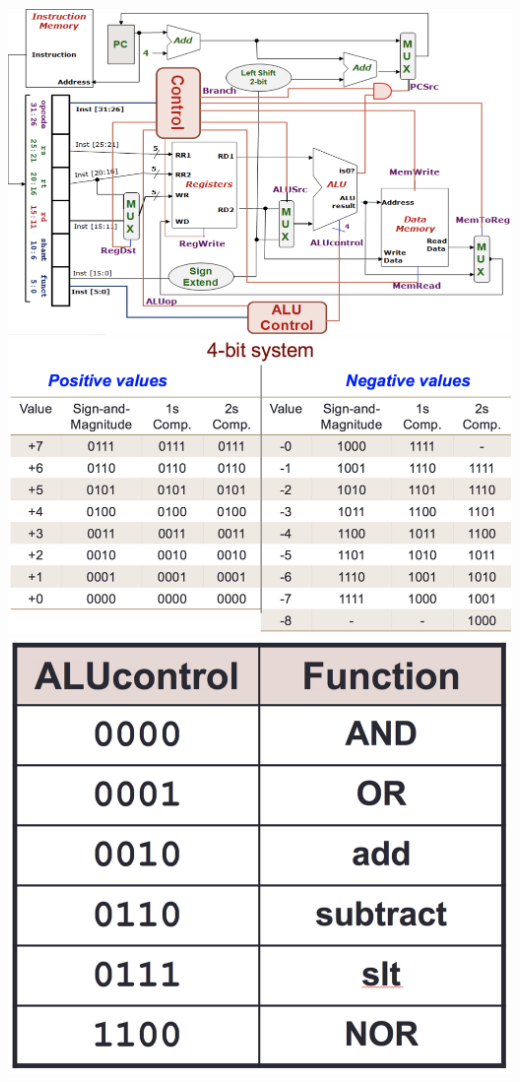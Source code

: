\documentclass[a4paper]{article} \usepackage[backend=biber, style=numeric, sorting=none]{biblatex}
\begin{document}
\begin{multicols*}{4}
\vfill\null
\columnbreak
{\centering \includegraphics[angle=90,origin=c,scale=0.35]{dataPath}}
\\ {\centering \includegraphics[angle=90,origin=c,scale=0.30]{fourBitRepresentation}}
{\centering \includegraphics[scale=0.13]{ALUControl}}

\end{multicols*}
\end{document}

